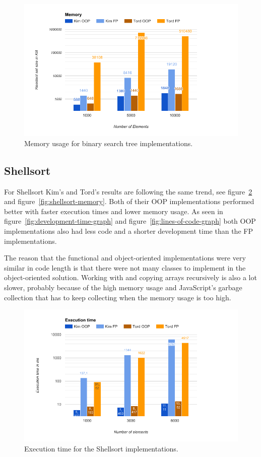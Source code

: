 \documentclass {article}
\begin{document}
\begin{figure}[H]
\centering
\includegraphics[width=\textwidth]{binary-tree-memory}

\caption{Memory usage for binary search tree implementations.}
\label{fig:binary-tree-memory}
\end{figure}
\subsection{Shellsort}
\label{sec:shellsort-results}
For Shellsort Kim's and Tord's results are following the same trend, see figure~\ref{fig:shellsort-runtime} and figure~\ref{fig:shellsort-memory}. Both of their OOP implementations performed better with faster execution times and lower memory usage. As seen in figure~\ref{fig:development-time-graph} and figure~\ref{fig:lines-of-code-graph} both OOP implementations also had less code and a shorter development time than the FP implementations.
 
The reason that the functional and object-oriented implementations were very similar in code length is that there were not many classes to implement in the object-oriented solution. Working with and copying arrays recursively is also a lot slower, probably because of the high memory usage and JavaScript's garbage collection that has to keep collecting when the memory usage is too high.
 
\begin{figure}[H]
\centering
\includegraphics[width=\textwidth]{shellsort-runtime}

\caption{Execution time for the Shellsort implementations.}
\label{fig:shellsort-runtime}
\end{figure}
 
\end{document}
